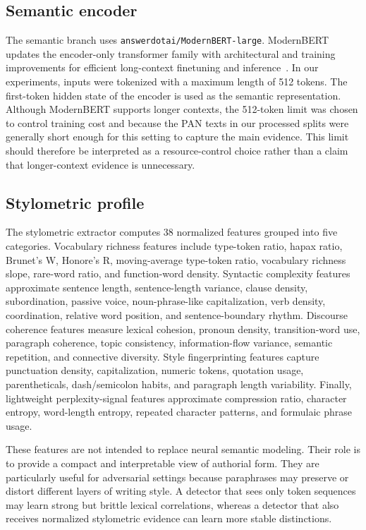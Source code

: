 \documentclass[]{ceurart}
\begin{document}
\subsection{Semantic encoder}

The semantic branch uses \texttt{answerdotai/ModernBERT-large}. ModernBERT updates the encoder-only transformer family with architectural and training improvements for efficient long-context finetuning and inference~\cite{warner2024modernbert,devlin2019bert}. In our experiments, inputs were tokenized with a maximum length of 512 tokens. The first-token hidden state of the encoder is used as the semantic representation. Although ModernBERT supports longer contexts, the 512-token limit was chosen to control training cost and because the PAN texts in our processed splits were generally short enough for this setting to capture the main evidence. This limit should therefore be interpreted as a resource-control choice rather than a claim that longer-context evidence is unnecessary.

\subsection{Stylometric profile}

The stylometric extractor computes 38 normalized features grouped into five categories. Vocabulary richness features include type-token ratio, hapax ratio, Brunet's W, Honore's R, moving-average type-token ratio, vocabulary richness slope, rare-word ratio, and function-word density. Syntactic complexity features approximate sentence length, sentence-length variance, clause density, subordination, passive voice, noun-phrase-like capitalization, verb density, coordination, relative word position, and sentence-boundary rhythm. Discourse coherence features measure lexical cohesion, pronoun density, transition-word use, paragraph coherence, topic consistency, information-flow variance, semantic repetition, and connective diversity. Style fingerprinting features capture punctuation density, capitalization, numeric tokens, quotation usage, parentheticals, dash/semicolon habits, and paragraph length variability. Finally, lightweight perplexity-signal features approximate compression ratio, character entropy, word-length entropy, repeated character patterns, and formulaic phrase usage.

These features are not intended to replace neural semantic modeling. Their role is to provide a compact and interpretable view of authorial form. They are particularly useful for adversarial settings because paraphrases may preserve or distort different layers of writing style. A detector that sees only token sequences may learn strong but brittle lexical correlations, whereas a detector that also receives normalized stylometric evidence can learn more stable distinctions.
\end{document}
